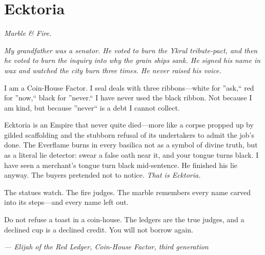 \newpage

\newpage

\chapter{Ecktoria}
\emph{Marble \& Fire.}

\noindent
{\Large
\textit{My grandfather was a senator. He voted to burn the Ykrul tribute-pact, and then he voted to burn the inquiry into why the grain ships sank. He signed his name in wax and watched the city burn three times. He never raised his voice.}

\vspace{0.5em}

I am a Coin-House Factor. I seal deals with three ribbons---white for ''ask,`` red for ''now,`` black for ''never.`` I have never used the black ribbon. Not because I am kind, but because ''never`` is a debt I cannot collect.

\vspace{0.5em}

Ecktoria is an Empire that never quite died---more like a corpse propped up by gilded scaffolding and the stubborn refusal of its undertakers to admit the job's done. The Everflame burns in every basilica not as a symbol of divine truth, but as a literal lie detector: swear a false oath near it, and your tongue turns black. I have seen a merchant's tongue turn black mid-sentence. He finished his lie anyway. The buyers pretended not to notice. \textit{That is Ecktoria.}

\vspace{0.5em}

The statues watch. The fire judges. The marble remembers every name carved into its steps---and every name left out.

\vspace{0.5em}

Do not refuse a toast in a coin-house. The ledgers are the true judges, and a declined cup is a declined credit. You will not borrow again.

\vspace{1em}

\noindent\textit{--- Elijah of the Red Ledger, Coin-House Factor, third generation}
}

\vspace{1em}

